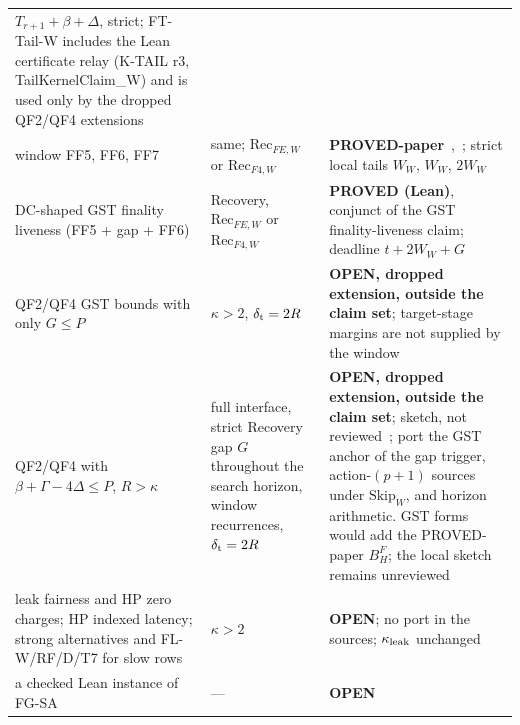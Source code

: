 \documentclass{article}
\theoremstyle{plain}
\theoremstyle{definition}
\theoremstyle{remark}
\newcommand{\OPEN}{\textbf{OPEN}}
\begin{document}
\begin{center}
\begin{longtable}{>{\raggedright\arraybackslash}p{5.4cm}
  >{\raggedright\arraybackslash}p{1.9cm}
  >{\raggedright\arraybackslash}p{5.6cm}}
  $T_{r+1}+\beta+\Delta$, strict; FT-Tail-W includes the Lean
  certificate relay (K-TAIL r3, \textsf{TailKernelClaim\_W}) and is
  used only by the dropped QF2/QF4 extensions\\
window FF5, FF6, FF7 & same; $\mathrm{Rec}_{FE,W}$ or $\mathrm{Rec}_{F4,W}$ &
  \textbf{PROVED-paper}~\cite[\S5]{FW},~\cite[FF5--FF7]{BPF}; strict local tails $W_W$, $W_W$, $2W_W$\\
DC-shaped GST finality liveness (FF5 + gap + FF6) & Recovery, $\mathrm{Rec}_{FE,W}$ or $\mathrm{Rec}_{F4,W}$ &
  \textbf{PROVED (Lean)}, conjunct of the GST finality-liveness claim; deadline $t+2W_W+G$\\
QF2/QF4 GST bounds with only $G\leq P$ & $\kappa>2$,
  $\delta_{\rm t}=2R$ & \textbf{OPEN, dropped extension, outside the claim set}; target-stage margins are not supplied
  by the window~\cite[\S5]{FW}\\
QF2/QF4 with $\beta+\Gamma-4\Delta\leq P$, $R>\kappa$ & full interface,
  strict Recovery gap $G$ throughout the search horizon, window recurrences,
  $\delta_{\rm t}=2R$ &
  \textbf{OPEN, dropped extension, outside the claim set}; sketch, not reviewed~\cite[\S5]{FW}; port the GST anchor of the
  gap trigger, action-$(p+1)$ sources under $\mathrm{Skip}_W$, and horizon
  arithmetic.  GST forms would add the PROVED-paper $B_H^F$; the local sketch remains unreviewed\\
leak fairness and HP zero charges; HP indexed latency;
  strong alternatives and FL-W/RF/D/T7 for slow rows & $\kappa>2$ &
  \OPEN; no port in the sources; $\kappa_{\rm leak}$ unchanged~\cite[F5]{FPR}\\
a checked Lean instance of FG-SA & --- & \OPEN\\
\hline
\end{longtable}
\end{center}
\end{document}
